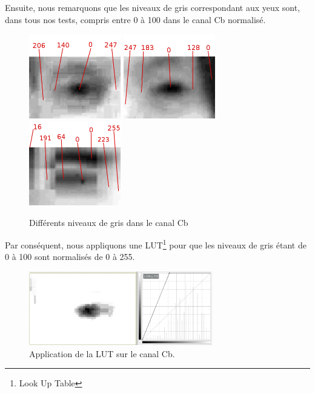 Ensuite, nous remarquons que les niveaux de gris correspondant aux yeux sont, dans tous nos tests, 
compris entre 0 à 100 dans le canal Cb normalisé. 

\begin{figure}[H]
  \centering
  \includegraphics[width=4cm]{image/008/normalized_info.png}
  \includegraphics[width=4cm]{image/017/normalized_info.png}
  \includegraphics[width=4cm]{image/ssm3/normalized_info.png}
  \caption{Différents niveaux de gris dans le canal Cb}
\end{figure}

Par conséquent, nous appliquons une LUT\footnote{Look Up Table} pour que les niveaux de gris étant de 0 à 100 sont normalisés de 
0 à 255.

\begin{figure}[H]
  \centering
  \includegraphics[width=8cm]{image/008/ycbcr_LUT.png}
  \caption{Application de la LUT sur le canal Cb.}
\end{figure}

